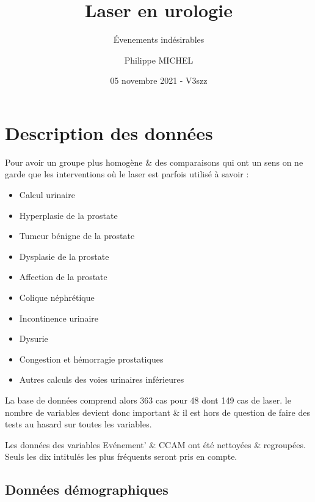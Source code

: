 \documentclass[a4paper,fontsize=10pt,french]{scrartcl}
\title{Laser en urologie}
\subtitle{Évenements indésirables}
\author{Philippe MICHEL}
\date{05 novembre 2021 - V3szz}
\begin{document}
\maketitle

\tableofcontents


\section{Description des données}\label{description-des-donnuxe9es}


Pour avoir un groupe plus homogène \& des comparaisons qui ont un sens
on ne garde que les interventions où le laser  est parfois  utilisé à
savoir :

\begin{itemize}
\item
  Calcul urinaire
\item
  Hyperplasie de la prostate
\item
  Tumeur bénigne de la prostate
\item
  Dysplasie de la prostate
\item
  Affection de la prostate
\item
  Colique néphrétique
\item
  Incontinence urinaire
\item
  Dysurie
\item
  Congestion et hémorragie prostatiques
\item
  Autres calculs des voies urinaires inférieures
\end{itemize}

La base de données comprend alors 363 cas pour 48 dont 149 cas de laser.
le nombre de variables devient donc important \& il est hors de question
de faire des tests au hasard sur toutes les variables.

Les données des variables \textsf{Evénement'} \&  \textsf{CCAM} ont été nettoyées \&
regroupées. Seuls les dix intitulés les plus fréquents seront pris en
compte.

\subsection{Données démographiques}\label{donnuxe9es-duxe9mographiques}
\end{document}
